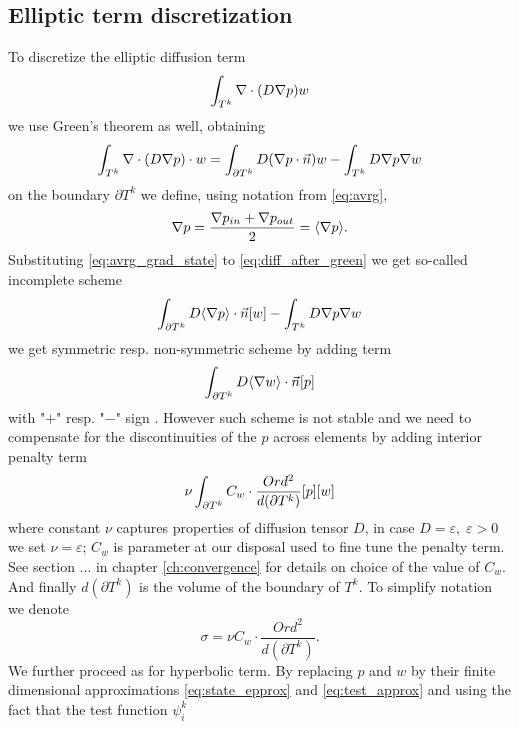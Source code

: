 \subsection{Elliptic term discretization}
\label{se:diff_term}
To discretize the elliptic diffusion term
$$
\int_{T^k}\nabla\cdot(D\nabla p) w
$$
we use Green's theorem as well, obtaining
\begin{equation}
	\label{eq:diff_after_green}
	\int_{T^k}\nabla \cdot (D \nabla p)\cdot w  = \int_{\partial T^k} D(\nabla p\cdot\vec{n}) w - \int_{T^k} D\nabla p \nabla w
\end{equation}
on the boundary $\partial T^k$ we define, using notation from \eqref{eq:avrg},
\begin{equation}
	\nabla p = \frac{\nabla p_{in} + \nabla p_{out}}{2} = \langle\nabla p\rangle.
	\label{eq:avrg_grad_state}
\end{equation}
Substituting \eqref{eq:avrg_grad_state} to \eqref{eq:diff_after_green} we get 
so-called incomplete scheme
\begin{equation}
		\int_{\partial T^k} D \langle\nabla p\rangle \cdot \vec{n} [w] - \int_{T^k} D\nabla p \nabla w
\end{equation}
we get symmetric resp. non-symmetric scheme by adding term
\begin{equation}
	\int_{\partial T^k} D \langle\nabla w \rangle\cdot \vec{n} [p]
\end{equation}
with "$+$" resp. "$-$" sign \cite{Kucera}. However such scheme is not stable and we need 
to compensate for
the discontinuities of the $p$ across elements by adding interior penalty term \cite{Kucera, Antonietti2013}
\begin{equation}
	\nu \int_{\partial T^k} C_w \cdot \frac{Ord^2}{d(\partial T^k)} [p][w]
\end{equation}
where constant $\nu$ captures properties of diffusion tensor $D$, in case $D = 
\varepsilon, \; \varepsilon > 0$ we set $\nu = \varepsilon$; $C_w$ is parameter 
at our disposal used to fine tune the penalty term.
See section ... in chapter 
\ref{ch:convergence} for details on choice of the value of $C_w$. And finally 
$d(\partial T^k)$ is the volume of the boundary of $T^k$. To simplify notation 
we denote
\begin{equation}\label{eq:diff_penalty_sigma}
\sigma = \nu C_w \cdot \frac{Ord^2}{d(\partial T^k)}.
\end{equation} 
We further proceed as for hyperbolic term. By replacing $p$ and $w$ by their 
finite dimensional approximations \eqref{eq:state_epprox} and 
\eqref{eq:test_approx} and using the fact that the test function $\psi^k_i$ 
